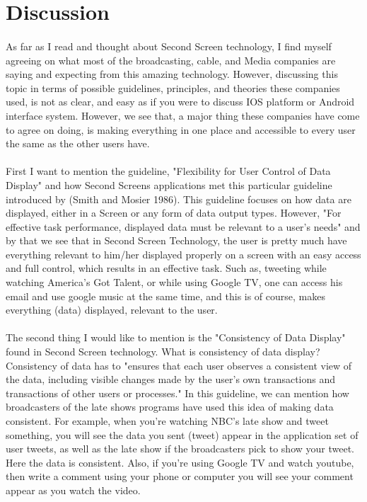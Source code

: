 \documentclass[12pt, oneside]{article}   	%
\begin{document}
  \section{Discussion}
    \paragraph{}
  As far as I read and thought about Second Screen technology, I find myself agreeing on what most of the broadcasting, cable, and Media companies are saying and expecting from this amazing technology.  However, discussing this topic in terms of possible guidelines, principles, and theories these companies used, is not as clear, and easy as if you were to discuss IOS platform or Android interface system.  However, we see that, a major thing these companies have come to agree on doing, is making everything in one place and accessible to every user the same as the other users have.
 \paragraph{}
 First I want to mention the guideline, "Flexibility for User Control of Data Display" and how Second Screens applications met this particular guideline introduced by (Smith and Mosier 1986).  This guideline focuses on how data are displayed, either in a Screen or any form of data output types.  However, "For effective task performance, displayed data must be relevant to a user's needs"\cite{Guideline} and by that we see that in Second Screen Technology, the user is pretty much have everything relevant to him/her displayed properly on a screen with an easy access and full control, which results in an effective task.  Such as, tweeting while watching America's Got Talent, or while using Google TV, one can access his email and use google music at the same time, and this is of course, makes everything (data) displayed, relevant to the user. 
  \paragraph{}
 The second thing I would like to mention is the "Consistency of Data Display" found in Second Screen technology.  What is consistency of data display?   Consistency of data has to "ensures that each user observes a consistent view of the data, including visible changes made by the user's own transactions and transactions of other users or processes."\cite{guidline2} In this guideline, we can mention how broadcasters of the late shows programs have used this idea of making data consistent.  For example, when you're watching NBC's late show and tweet something, you will see the data you sent (tweet) appear in the application set of user tweets, as well as the late show if the broadcasters pick to show your tweet.  Here the data is consistent.  Also, if you're using Google TV and watch youtube, then write a comment using your phone or computer you will see your comment appear as you watch the video.
\end{document}
